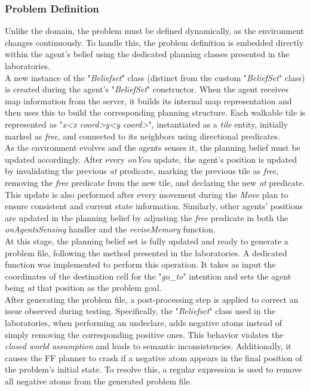         \subsubsection{Problem Definition}
            Unlike the domain, the problem must be defined dynamically, as the environment changes continuously. To handle this, the problem definition is embedded directly within the agent's belief using the dedicated planning classes presented in the laboratories.
            \medskip\\
            A new instance of the "\textit{Beliefset}" class (distinct from the custom "\textit{BeliefSet}" class) is created during the agent's "\textit{BeliefSet}" constructor. When the agent receives map information from the server, it builds its internal map representation and then uses this to build the corresponding planning structure. Each walkable tile is represented as "\textit{x<x coord>y<y coord>}", instantiated as a \textit{tile} entity, initially marked as \textit{free}, and connected to its neighbors using directional predicates.
            \medskip\\
            As the environment evolves and the agents senses it, the planning belief must be updated accordingly. After every \textit{onYou} update, the agent's position is updated by invalidating the previous \textit{at} predicate, marking the previous tile as \textit{free}, removing the \textit{free} predicate from the new tile, and declaring the new \textit{at} predicate. This update is also performed after every movement during the \textit{Move} plan to ensure consistent and current state information. Similarly, other agents' positions are updated in the planning belief by adjusting the \textit{free} predicate in both the \textit{onAgentsSensing} handler and the \textit{reviseMemory} function.
            \medskip\\
            At this stage, the planning belief set is fully updated and ready to generate a problem file, following the method presented in the laboratories. A dedicated function was implemented to perform this operation. It takes as input the coordinates of the destination cell for the "\textit{go\_to}" intention and sets the agent being \textit{at} that position as the problem goal.
            \medskip\\
            After generating the problem file, a post-processing step is applied to correct an issue observed during testing. Specifically, the "\textit{Beliefset}" class used in the laboratories, when performing an undeclare, adds negative atoms instead of simply removing the corresponding positive ones. This behavior violates the \textit{closed world assumption} and leads to semantic inconsistencies. Additionally, it causes the FF planner to crash if a negative atom appears in the final position of the problem's initial state. To resolve this, a regular expression is used to remove all negative atoms from the generated problem file.

